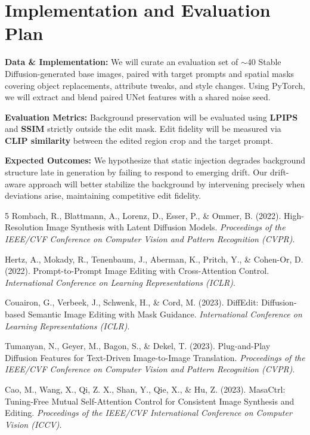 \documentclass[11pt]{article}
\begin{document}
\section{Implementation and Evaluation Plan}
\textbf{Data \& Implementation:} We will curate an evaluation set of $\sim$40 Stable Diffusion-generated base images, paired with target prompts and spatial masks covering object replacements, attribute tweaks, and style changes. Using PyTorch, we will extract and blend paired UNet features with a shared noise seed. 

\textbf{Evaluation Metrics:} Background preservation will be evaluated using \textbf{LPIPS} and \textbf{SSIM} strictly outside the edit mask. Edit fidelity will be measured via \textbf{CLIP similarity} between the edited region crop and the target prompt. 

\textbf{Expected Outcomes:} We hypothesize that static injection degrades background structure late in generation by failing to respond to emerging drift. Our drift-aware approach will better stabilize the background by intervening precisely when deviations arise, maintaining competitive edit fidelity.

\vspace{1em}

\renewcommand{\refname}{\normalsize References}
\begin{thebibliography}{5}
\small
{} 
Rombach, R., Blattmann, A., Lorenz, D., Esser, P., \& Ommer, B. (2022). High-Resolution Image Synthesis with Latent Diffusion Models. \textit{Proceedings of the IEEE/CVF Conference on Computer Vision and Pattern Recognition (CVPR)}.

Hertz, A., Mokady, R., Tenenbaum, J., Aberman, K., Pritch, Y., \& Cohen-Or, D. (2022). Prompt-to-Prompt Image Editing with Cross-Attention Control. \textit{International Conference on Learning Representations (ICLR)}.

Couairon, G., Verbeek, J., Schwenk, H., \& Cord, M. (2023). DiffEdit: Diffusion-based Semantic Image Editing with Mask Guidance. \textit{International Conference on Learning Representations (ICLR)}.

Tumanyan, N., Geyer, M., Bagon, S., \& Dekel, T. (2023). Plug-and-Play Diffusion Features for Text-Driven Image-to-Image Translation. \textit{Proceedings of the IEEE/CVF Conference on Computer Vision and Pattern Recognition (CVPR)}.

Cao, M., Wang, X., Qi, Z. X., Shan, Y., Qie, X., \& Hu, Z. (2023). MasaCtrl: Tuning-Free Mutual Self-Attention Control for Consistent Image Synthesis and Editing. \textit{Proceedings of the IEEE/CVF International Conference on Computer Vision (ICCV)}.
\end{thebibliography}
\end{document}
